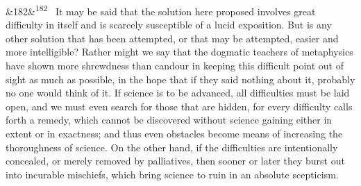\documentclass[12pt]{article}
\newcommand{\para}[1][]{\par\noindent\ifx&#1&\else\textsuperscript{\footnotesize #1}~\fi}
\begin{document}
\para[182] It may be said that the solution here proposed involves great difficulty in itself and is scarcely susceptible of a lucid exposition. But is any other solution that has been attempted, or that may be attempted, easier and more intelligible? Rather might we say that the dogmatic teachers of metaphysics have shown more shrewdness than candour in keeping this difficult point out of sight as much as possible, in the hope that if they said nothing about it, probably no one would think of it. If science is to be advanced, all difficulties must be laid open, and we must even search for those that are hidden, for every difficulty calls forth a remedy, which cannot be discovered without science gaining either in extent or in exactness; and thus even obstacles become means of increasing the thoroughness of science. On the other hand, if the difficulties are intentionally concealed, or merely removed by palliatives, then sooner or later they burst out into incurable mischiefs, which bring science to ruin in an absolute scepticism.
\end{document}
